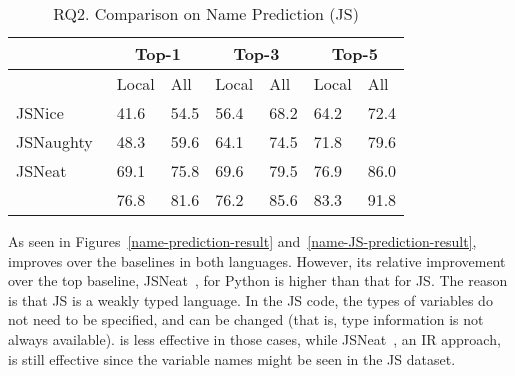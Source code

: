 \begin{table}[t]%
  \caption{RQ2. Comparison on Name Prediction (JS)}
  \vspace{-8pt}
	\begin{center}
		\small
		\renewcommand{\arraystretch}{1} \begin{tabular}{|p{1.9cm}<{\centering}|p{0.65cm}<{\centering}|p{0.65cm}<{\centering}|p{0.65cm}<{\centering}|p{0.65cm}<{\centering}|p{0.65cm}<{\centering}|p{0.65cm}<{\centering}|}
			
			\hline
                       & \multicolumn{2}{c|}{Top-1}         & \multicolumn{2}{c|}{Top-3}         & \multicolumn{2}{c|}{Top-5} \\
			\hline
                       & Local & All & Local & All & Local & All  \\ 
			\hline
		        JSNice~\cite{JSNice2015} &  41.6    & 54.5  & 56.4 &    68.2   & 64.2      &   72.4    \\
			JSNaughty~\cite{JSNaughty2017}  &   48.3   &  59.6    &  64.1    &  74.5    &  71.8    &   79.6    \\
			JSNeat~\cite{icse19}  &   69.1   &  75.8    &  69.6    & 79.5     &  76.9    & 86.0     \\
			\hline
			{\bf {\tool}} & 76.8 & 81.6 & 76.2 & 85.6 & 83.3 & 91.8 \\
			\hline
		\end{tabular}
		\label{name-JS-result}
	\end{center}
\end{table}

As seen in Figures~\ref{name-prediction-result}
and~\ref{name-JS-prediction-result}, {\tool} improves over the
baselines in both languages. However, its relative improvement over
the top baseline, JSNeat~\cite{icse19}, for Python is higher than that
for JS. The reason is that JS is a weakly typed language. In the JS
code, the types of variables do not need to be specified, and can be
changed (that is, type information is not always available). {\tool}
is less effective in those cases, while JSNeat~\cite{icse19}, an IR
approach, is still effective since the variable names might be seen in
the JS dataset.




